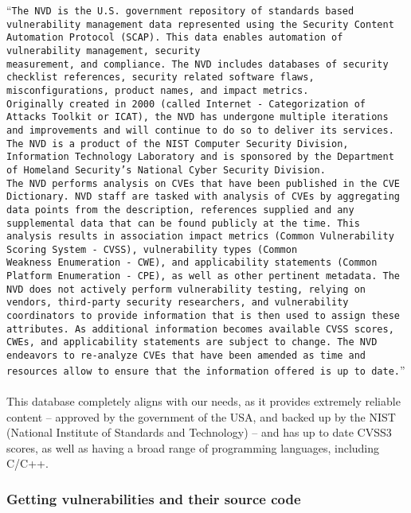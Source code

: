 \enquote{\texttt{The NVD  is the U.S. government repository of standards based vulnerability management data represented using the Security Content Automation Protocol (SCAP). This data enables automation of vulnerability management, security\\ measurement, and compliance. The NVD includes databases of security checklist references, security related software flaws, misconfigurations, product names, and impact metrics.
		\\
		Originally created in 2000 (called Internet - Categorization of Attacks Toolkit or ICAT), the NVD has undergone multiple iterations and improvements and will continue to do so to deliver its services. The NVD is a product of the NIST Computer Security Division, Information Technology Laboratory and is sponsored by the Department of Homeland Security’s National Cyber Security Division.
		\\
		The NVD performs analysis on CVEs that have been published in the CVE Dictionary. NVD staff are tasked with analysis of CVEs by aggregating data points from the description, references supplied and any supplemental data that can be found publicly at the time. This analysis results in association impact metrics (Common Vulnerability Scoring System - CVSS), vulnerability types (Common \\Weakness Enumeration - CWE), and applicability statements (Common Platform Enumeration - CPE), as well as other pertinent metadata. The NVD does not actively perform vulnerability testing, relying on vendors, third-party security researchers, and vulnerability coordinators to provide information that is then used to assign these attributes. As additional information becomes available CVSS scores, CWEs, and applicability statements are subject to change. The NVD endeavors to re-analyze CVEs that have been amended as time and resources allow to ensure that the information offered is up to date.}}\parencite{nvd}
\\\\
This database completely aligns with our needs, as it provides extremely reliable content -- approved by the government of the USA, and backed up by the NIST (National Institute of Standards and Technology) -- and has up to date CVSS3 scores, as well as having a broad range of programming languages, including C/C++. 

\subsubsection{Getting vulnerabilities and their source code}

